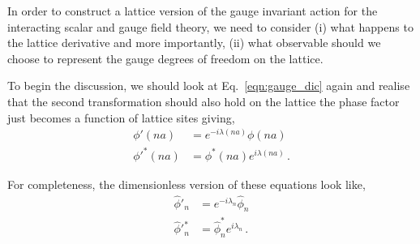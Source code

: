\documentclass[11pt]{article}
\theoremstyle{definition}
\begin{document}
In order to construct a lattice version of the gauge invariant action for the interacting scalar and gauge field theory, we need to consider (i) what happens to the lattice derivative and more importantly, (ii) what observable should we choose to represent the gauge degrees of freedom on the lattice.  

To begin the discussion, we should look at Eq.~\eqref{eqn:gauge_dic} again and realise that the second transformation should also hold on the lattice the phase factor just becomes a function of lattice sites giving,
\begin{align}
    \phi'(na) &= e^{-i\lambda(na)}\phi(na) \nonumber \\
    \phi'^{*}(na) &= \phi^*(na) e^{i\lambda(na)} \,.
\end{align}

For completeness, the dimensionless version of these equations look like,
\begin{align}
    \hat{\phi}'_n &= e^{-i\lambda_n}\hat{\phi}_n \nonumber \\
    \hat{\phi}'^{*}_n &= \hat{\phi}^*_n e^{i\lambda_n} \,.
\end{align}
\end{document}
